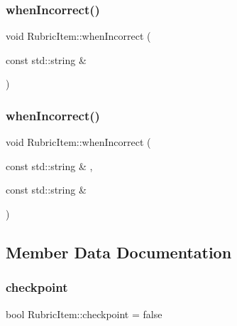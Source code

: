\hypertarget{class_rubric_item_a236b6f498b326303d0f3ae6613e82638}{}\label{class_rubric_item_a236b6f498b326303d0f3ae6613e82638} 
\subsubsection{\texorpdfstring{when\+Incorrect()}{whenIncorrect()}\hspace{0.1cm}{\footnotesize\ttfamily [1/2]}}
{\footnotesize\ttfamily void Rubric\+Item\+::when\+Incorrect (\begin{DoxyParamCaption}\item[{const std\+::string \&}]{ }\end{DoxyParamCaption})}

\hypertarget{class_rubric_item_aa62614e36ef2cb7bc60fdd03183ff46e}{}\label{class_rubric_item_aa62614e36ef2cb7bc60fdd03183ff46e} 
\subsubsection{\texorpdfstring{when\+Incorrect()}{whenIncorrect()}\hspace{0.1cm}{\footnotesize\ttfamily [2/2]}}
{\footnotesize\ttfamily void Rubric\+Item\+::when\+Incorrect (\begin{DoxyParamCaption}\item[{const std\+::string \&}]{,  }\item[{const std\+::string \&}]{ }\end{DoxyParamCaption})}



\subsection{Member Data Documentation}
\hypertarget{class_rubric_item_a0f240be9e7b0dc6853b3e2b0df5713b8}{}\label{class_rubric_item_a0f240be9e7b0dc6853b3e2b0df5713b8} 
\subsubsection{\texorpdfstring{checkpoint}{checkpoint}}
{\footnotesize\ttfamily bool Rubric\+Item\+::checkpoint = false}

